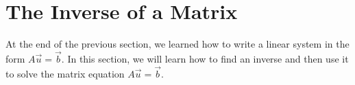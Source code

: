 %	
%
%
%
%
%
%
%
%	
%	

\vfill \pagebreak
\section{The Inverse of a Matrix}
\label{sect:matrix:inverse}

At the end of the previous section, we learned how to write a linear system in the form $A\vec{u}=\vec{b}$.  In this section, we will learn how to find an inverse and then use it to solve the matrix equation $A\vec{u}=\vec{b}$.  

